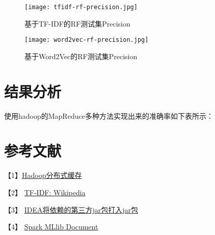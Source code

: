 \documentclass[lang=cn,11pt]{elegantpaper}
\begin{document}
  \begin{figure}[!htbp]
    \begin{minipage}[t]{0.5\linewidth}
    \centering
    \texttt{[image: tfidf-rf-precision.jpg]}
    \caption{基于TF-IDF的RF测试集Precision}
    \label{fig:side:a}
    \end{minipage}
    \begin{minipage}[t]{0.5\linewidth}
    \centering
    \texttt{[image: word2vec-rf-precision.jpg]}
    \caption{基于Word2Vec的RF测试集Precision}
    \label{fig:side:b}
    \end{minipage}
    \end{figure}

\section{结果分析}
使用hadoop的MapReduce多种方法实现出来的准确率如下表所示：

\section{参考文献}
【1】\href{https://www.cnblogs.com/loveling-0239/p/7884195.html}{Hadoop分布式缓存}\par
【2】 \href{https://en.wikipedia.org/wiki/Tf%E2%80%93idf}{TF-IDF: Wikipedia} \par
【3】 \href{https://blog.csdn.net/qq_41571900/article/details/85069055}{IDEA将依赖的第三方jar包打入jar包} \par
【4】 \href{http://spark.apache.org/docs/latest/ml-features.html}{Spark MLlib Document}
\end{document}
